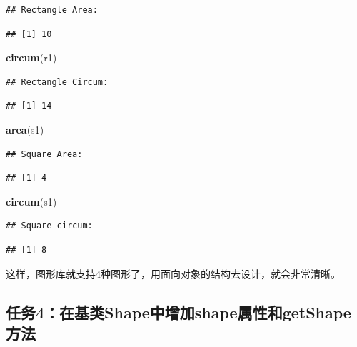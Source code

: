 \documentclass[]{book}
\newenvironment{Shaded}{\begin{snugshade}}{\end{snugshade}}
\newcommand{\KeywordTok}[1]{\textcolor[rgb]{0.13,0.29,0.53}{\textbf{#1}}}
\newcommand{\NormalTok}[1]{#1}
\begin{document}
\begin{verbatim}
## Rectangle Area:
\end{verbatim}

\begin{verbatim}
## [1] 10
\end{verbatim}

\begin{Shaded}
\begin{Highlighting}[]
\KeywordTok{circum}\NormalTok{(r1)}
\end{Highlighting}
\end{Shaded}

\begin{verbatim}
## Rectangle Circum:
\end{verbatim}

\begin{verbatim}
## [1] 14
\end{verbatim}

\begin{Shaded}
\begin{Highlighting}[]
\KeywordTok{area}\NormalTok{(s1)}
\end{Highlighting}
\end{Shaded}

\begin{verbatim}
## Square Area:
\end{verbatim}

\begin{verbatim}
## [1] 4
\end{verbatim}

\begin{Shaded}
\begin{Highlighting}[]
\KeywordTok{circum}\NormalTok{(s1)}
\end{Highlighting}
\end{Shaded}

\begin{verbatim}
## Square circum:
\end{verbatim}

\begin{verbatim}
## [1] 8
\end{verbatim}

这样，图形库就支持4种图形了，用面向对象的结构去设计，就会非常清晰。

\subsection{任务4：在基类Shape中增加shape属性和getShape方法}\label{4shapeshapegetshape}
\end{document}

